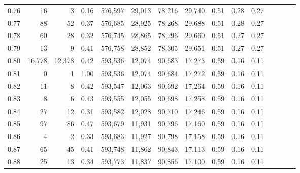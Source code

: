 \begin{tabular}{rrrcrrrrrrrrrrr}
0.76 &      16 &       3 &                                       0.16 &  576,597 &   29,013 &   78,216 &   29,740 &  0.51 &  0.28 &                         0.27 \\
0.77 &      88 &      52 &                                       0.37 &  576,685 &   28,925 &   78,268 &   29,688 &  0.51 &  0.28 &                         0.27 \\
0.78 &      60 &      28 &                                       0.32 &  576,745 &   28,865 &   78,296 &   29,660 &  0.51 &  0.27 &                         0.27 \\
0.79 &      13 &       9 &                                       0.41 &  576,758 &   28,852 &   78,305 &   29,651 &  0.51 &  0.27 &                         0.27 \\
0.80 &  16,778 &  12,378 &                                       0.42 &  593,536 &   12,074 &   90,683 &   17,273 &  0.59 &  0.16 &                         0.11 \\
0.81 &       0 &       1 &                                       1.00 &  593,536 &   12,074 &   90,684 &   17,272 &  0.59 &  0.16 &                         0.11 \\
0.82 &      11 &       8 &                                       0.42 &  593,547 &   12,063 &   90,692 &   17,264 &  0.59 &  0.16 &                         0.11 \\
0.83 &       8 &       6 &                                       0.43 &  593,555 &   12,055 &   90,698 &   17,258 &  0.59 &  0.16 &                         0.11 \\
0.84 &      27 &      12 &                                       0.31 &  593,582 &   12,028 &   90,710 &   17,246 &  0.59 &  0.16 &                         0.11 \\
0.85 &      97 &      86 &                                       0.47 &  593,679 &   11,931 &   90,796 &   17,160 &  0.59 &  0.16 &                         0.11 \\
0.86 &       4 &       2 &                                       0.33 &  593,683 &   11,927 &   90,798 &   17,158 &  0.59 &  0.16 &                         0.11 \\
0.87 &      65 &      45 &                                       0.41 &  593,748 &   11,862 &   90,843 &   17,113 &  0.59 &  0.16 &                         0.11 \\
0.88 &      25 &      13 &                                       0.34 &  593,773 &   11,837 &   90,856 &   17,100 &  0.59 &  0.16 &                         0.11 \\

\end{tabular}
